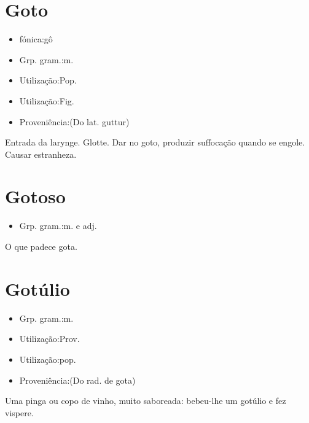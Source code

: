\section{Goto}
\begin{itemize}
\item {fónica:gô}
\end{itemize}
\begin{itemize}
\item {Grp. gram.:m.}
\end{itemize}
\begin{itemize}
\item {Utilização:Pop.}
\end{itemize}
\begin{itemize}
\item {Utilização:Fig.}
\end{itemize}
\begin{itemize}
\item {Proveniência:(Do lat. \textunderscore guttur\textunderscore )}
\end{itemize}
Entrada da larynge.
Glotte.
\textunderscore Dar no goto\textunderscore , produzir suffocação quando se engole.
Causar estranheza.
\section{Gotoso}
\begin{itemize}
\item {Grp. gram.:m.  e  adj.}
\end{itemize}
O que padece gota.
\section{Gotúlio}
\begin{itemize}
\item {Grp. gram.:m.}
\end{itemize}
\begin{itemize}
\item {Utilização:Prov.}
\end{itemize}
\begin{itemize}
\item {Utilização:pop.}
\end{itemize}
\begin{itemize}
\item {Proveniência:(Do rad. de \textunderscore gota\textunderscore )}
\end{itemize}
Uma pinga ou copo de vinho, muito saboreada: \textunderscore bebeu-lhe um gotúlio e fez vispere\textunderscore .
